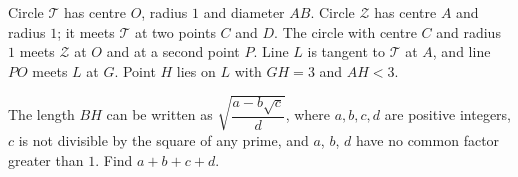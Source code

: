Circle $\mathcal T$ has centre $O$, radius $1$ and diameter $AB$. Circle $\mathcal Z$ has centre $A$ and radius $1$; it meets $\mathcal T$ at two points $C$ and $D$. The circle with centre $C$ and radius $1$ meets $\mathcal Z$ at $O$ and at a second point $P$. Line $L$ is tangent to $\mathcal T$ at $A$, and line $PO$ meets $L$ at $G$. Point $H$ lies on $L$ with $GH=3$ and $AH<3$.

The length $BH$ can be written as $\sqrt{\dfrac{a-b\sqrt c}{d}}$, where $a,b,c,d$ are positive integers, $c$ is not divisible by the square of any prime, and $a$, $b$, $d$ have no common factor greater than $1$. Find $a+b+c+d$.
